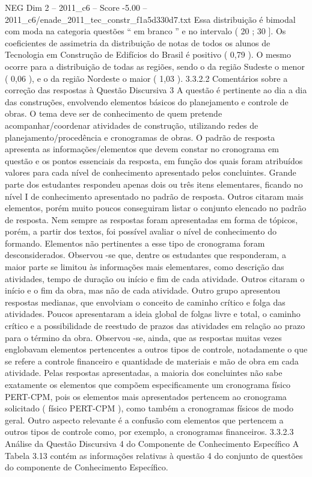 \begin{textsample}{NEG Dim 2 – 2011\_c6 – Score -5.00 – 2011\_c6/enade\_2011\_tec\_constr\_f1a5d330d7.txt}
Essa distribuição é bimodal com moda na categoria questões “ em branco ” e no intervalo ( 20 ; 30 ].
Os coeficientes de assimetria da distribuição de notas de todos os alunos de Tecnologia em Construção de Edifícios do Brasil é positivo ( 0,79 ).
O mesmo ocorre para a distribuição de todas as regiões, sendo o da região Sudeste o menor ( 0,06 ), e o da região Nordeste o maior ( 1,03 ). 3.3.2.2 Comentários sobre a correção das respostas à Questão Discursiva 3 A questão é pertinente ao dia a dia das construções, envolvendo elementos básicos do planejamento e controle de obras.
O tema deve ser de conhecimento de quem pretende acompanhar/coordenar atividades de construção, utilizando redes de planejamento/procedência e cronogramas de obras.
O padrão de resposta apresenta as informações/elementos que devem constar no cronograma em questão e os pontos essenciais da resposta, em função dos quais foram atribuídos valores para cada nível de conhecimento apresentado pelos concluintes.
Grande parte dos estudantes respondeu apenas dois ou três itens elementares, ficando no nível I de conhecimento apresentado no padrão de resposta.
Outros citaram mais elementos, porém muito poucos conseguiram listar o conjunto elencado no padrão de resposta.
Nem sempre as respostas foram apresentadas em forma de tópicos, porém, a partir dos textos, foi possível avaliar o nível de conhecimento do formando.
Elementos não pertinentes a esse tipo de cronograma foram desconsiderados.
Observou -se que, dentre os estudantes que responderam, a maior parte se limitou às informações mais elementares, como descrição das atividades, tempo de duração ou início e fim de cada atividade.
Outros citaram o início e o fim da obra, mas não de cada atividade.
Outro grupo apresentou respostas medianas, que envolviam o conceito de caminho crítico e folga das atividades.
Poucos apresentaram a ideia global de folgas livre e total, o caminho crítico e a possibilidade de reestudo de prazos das atividades em relação ao prazo para o término da obra.
Observou -se, ainda, que as respostas muitas vezes englobavam elementos pertencentes a outros tipos de controle, notadamente o que se refere a controle financeiro e quantidade de materiais e mão de obra em cada atividade.
Pelas respostas apresentadas, a maioria dos concluintes não sabe exatamente os elementos que compõem especificamente um cronograma físico PERT-CPM, pois os elementos mais apresentados pertencem ao cronograma solicitado ( físico PERT-CPM ), como também a cronogramas físicos de modo geral.
Outro aspecto relevante é a confusão com elementos que pertencem a outros tipos de controle como, por exemplo, a cronogramas financeiros. 3.3.2.3 Análise da Questão Discursiva 4 do Componente de Conhecimento Específico A Tabela 3.13 contém as informações relativas à questão 4 do conjunto de questões do componente de Conhecimento Específico.

\end{textsample}
